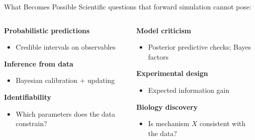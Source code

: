 \documentclass[aspectratio=169]{beamer}
\begin{document}
\begin{frame}{What Becomes Possible}
	\small
	Scientific questions that forward simulation cannot pose:

	\medskip
	\begin{columns}[T]
		\begin{column}{0.48\textwidth}
			\textbf{Probabilistic predictions}
			\begin{itemize}\itemsep0pt\parskip0pt
				\item Credible intervals on observables
			\end{itemize}

			\medskip
			\textbf{Inference from data}
			\begin{itemize}\itemsep0pt\parskip0pt
				\item Bayesian calibration + updating
			\end{itemize}

			\medskip
			\textbf{Identifiability}
			\begin{itemize}\itemsep0pt\parskip0pt
				\item Which parameters does the data constrain?
			\end{itemize}
		\end{column}
		\begin{column}{0.48\textwidth}
			\textbf{Model criticism}
			\begin{itemize}\itemsep0pt\parskip0pt
				\item Posterior predictive checks; Bayes factors
			\end{itemize}

			\medskip
			\textbf{Experimental design}
			\begin{itemize}\itemsep0pt\parskip0pt
				\item Expected information gain
			\end{itemize}

			\medskip
			\textbf{Biology discovery}
			\begin{itemize}\itemsep0pt\parskip0pt
				\item Is mechanism $X$ consistent with the data?
			\end{itemize}
		\end{column}
	\end{columns}
\end{frame}
\end{document}
